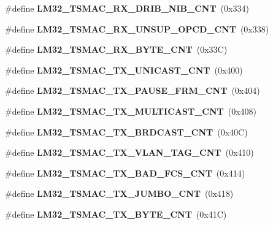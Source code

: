 \begin{DoxyCompactItemize}
\item 
\mbox{\label{group__lm32__tsmac_ga3f7c8d6bf3c31501a005120ef585dcc0}} 
\#define {\bfseries L\+M32\+\_\+\+T\+S\+M\+A\+C\+\_\+\+R\+X\+\_\+\+D\+R\+I\+B\+\_\+\+N\+I\+B\+\_\+\+C\+NT}~(0x334)
\item 
\mbox{\label{group__lm32__tsmac_ga8d52a2ae9eaa3ccc9469dc70c94d0aab}} 
\#define {\bfseries L\+M32\+\_\+\+T\+S\+M\+A\+C\+\_\+\+R\+X\+\_\+\+U\+N\+S\+U\+P\+\_\+\+O\+P\+C\+D\+\_\+\+C\+NT}~(0x338)
\item 
\mbox{\label{group__lm32__tsmac_ga897c8b8427d44478d7ec763c9b53c9c5}} 
\#define {\bfseries L\+M32\+\_\+\+T\+S\+M\+A\+C\+\_\+\+R\+X\+\_\+\+B\+Y\+T\+E\+\_\+\+C\+NT}~(0x33\+C)
\item 
\mbox{\label{group__lm32__tsmac_gafafbab0c765fb4255feef2fada684be0}} 
\#define {\bfseries L\+M32\+\_\+\+T\+S\+M\+A\+C\+\_\+\+T\+X\+\_\+\+U\+N\+I\+C\+A\+S\+T\+\_\+\+C\+NT}~(0x400)
\item 
\mbox{\label{group__lm32__tsmac_ga8285b68044bc1c31407edd567988c17e}} 
\#define {\bfseries L\+M32\+\_\+\+T\+S\+M\+A\+C\+\_\+\+T\+X\+\_\+\+P\+A\+U\+S\+E\+\_\+\+F\+R\+M\+\_\+\+C\+NT}~(0x404)
\item 
\mbox{\label{group__lm32__tsmac_gab16535d05bf0a0e742a64cca495f01fd}} 
\#define {\bfseries L\+M32\+\_\+\+T\+S\+M\+A\+C\+\_\+\+T\+X\+\_\+\+M\+U\+L\+T\+I\+C\+A\+S\+T\+\_\+\+C\+NT}~(0x408)
\item 
\mbox{\label{group__lm32__tsmac_gae275ec1328701d80a7ee82ca15bff613}} 
\#define {\bfseries L\+M32\+\_\+\+T\+S\+M\+A\+C\+\_\+\+T\+X\+\_\+\+B\+R\+D\+C\+A\+S\+T\+\_\+\+C\+NT}~(0x40\+C)
\item 
\mbox{\label{group__lm32__tsmac_ga151f356f6b387948ea53953e9116c6a0}} 
\#define {\bfseries L\+M32\+\_\+\+T\+S\+M\+A\+C\+\_\+\+T\+X\+\_\+\+V\+L\+A\+N\+\_\+\+T\+A\+G\+\_\+\+C\+NT}~(0x410)
\item 
\mbox{\label{group__lm32__tsmac_gaf940c70be5f7ddd73581637b375b3f36}} 
\#define {\bfseries L\+M32\+\_\+\+T\+S\+M\+A\+C\+\_\+\+T\+X\+\_\+\+B\+A\+D\+\_\+\+F\+C\+S\+\_\+\+C\+NT}~(0x414)
\item 
\mbox{\label{group__lm32__tsmac_ga5900a715102e70cb267cd669a352b159}} 
\#define {\bfseries L\+M32\+\_\+\+T\+S\+M\+A\+C\+\_\+\+T\+X\+\_\+\+J\+U\+M\+B\+O\+\_\+\+C\+NT}~(0x418)
\item 
\mbox{\label{group__lm32__tsmac_gac74f202052ef3060021a0b9b358fb28b}} 
\#define {\bfseries L\+M32\+\_\+\+T\+S\+M\+A\+C\+\_\+\+T\+X\+\_\+\+B\+Y\+T\+E\+\_\+\+C\+NT}~(0x41\+C)
\end{DoxyCompactItemize}


